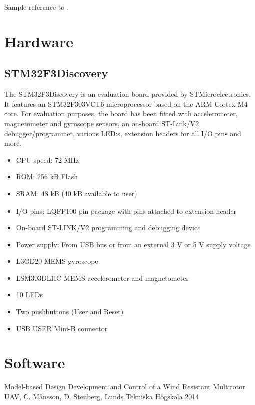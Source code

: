 \documentclass[a4paper]{article}
\begin{document}
Sample reference to \cite{stenberg}.

\section{Hardware}

\subsection{STM32F3Discovery}
The STM32F3Discovery is an evaluation board provided by STMicroelectronics. It features an STM32F303VCT6 microprocessor based on the ARM Cortex-M4 core. For evaluation purposes, the board has been fitted with accelerometer, magnetometer and gyroscope sensors, an on-board ST-Link/V2 debugger/programmer, various LED:s, extension headers for all I/O pins and more.

\begin{itemize}
  \item CPU speed: $72$ MHz
  \item ROM: 256 kB Flash
  \item SRAM: 48 kB (40 kB available to user)
  \item I/O pins: LQFP100 pin package with pins attached to extension header
  \item On-board ST-LINK/V2 programming and debugging device
  \item Power supply: From USB bus or from an external 3 V or 5 V supply voltage
  \item L3GD20 MEMS gyroscope
  \item LSM303DLHC MEMS accelerometer and magnetometer
  \item 10 LEDs
  \item Two pushbuttons (User and Reset)
  \item USB USER Mini-B connector
\end{itemize}

\section{Software}

\begin{thebibliography}{99}
 Model-based Design Development and Control of a Wind Resistant Multirotor UAV, C. Månsson, D. Stenberg, Lunds Tekniska Högskola 2014
\end{thebibliography}
\end{document}

